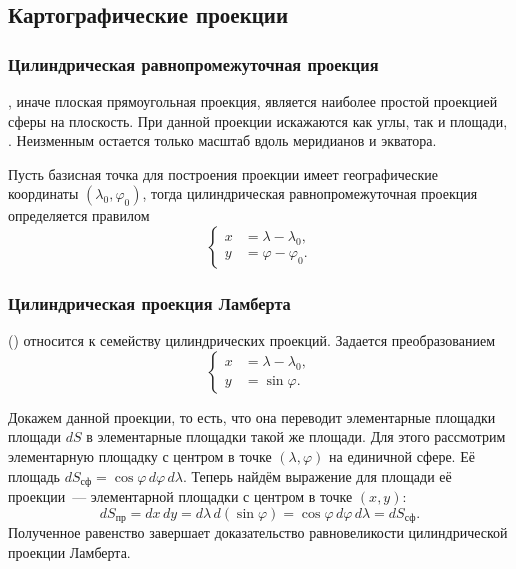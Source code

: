 \subsection{Картографические проекции}

\subsubsection{Цилиндрическая равнопромежуточная проекция}

, иначе плоская прямоугольная проекция, является наиболее простой проекцией сферы на плоскость. При данной проекции искажаются как углы, так и площади, . Неизменным остается только масштаб вдоль меридианов и экватора. 

Пусть базисная точка для построения проекции имеет географические координаты $(\lambda_0, \varphi_0)$, тогда цилиндрическая равнопромежуточная проекция определяется правилом
\begin{equation}
    \left\{\begin{aligned}
        x &= \lambda - \lambda_0,\\
        y &= \varphi - \varphi_0.
    \end{aligned}\right.
\end{equation}

\subsubsection{Цилиндрическая проекция Ламберта}

 () относится к семейству цилиндрических  проекций. Задается преобразованием
\begin{equation*}
    \left\{\begin{aligned}
        x &= \lambda - \lambda_0,\\
        y &= \sin \varphi.
    \end{aligned}\right.
\end{equation*}

Докажем  данной проекции, то есть, что она переводит элементарные площадки площади $dS$ в элементарные площадки такой же площади. Для этого рассмотрим элементарную площадку с центром в точке $(\lambda, \varphi)$ на единичной сфере. Её площадь $dS_\text{сф} = \cos \varphi \, d\varphi \, d\lambda $. Теперь найдём выражение для площади её проекции~--- элементарной площадки с центром в точке $(x, y)$: 
\begin{equation*}
    dS_\text{пр} = dx \, dy = d\lambda \, d(\sin \varphi) = \cos\varphi \, d\varphi \, d\lambda = dS_\text{сф}.
\end{equation*} 
Полученное равенство завершает доказательство равновеликости цилиндрической проекции Ламберта.

